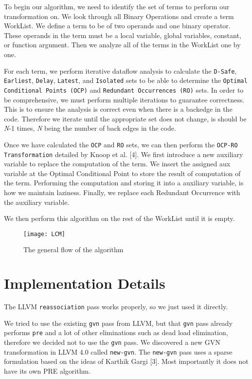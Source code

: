 \documentclass[onecolumn,10pt]{journal}
\begin{document}
  To begin our algorithm, we need to identify the set of terms to perform our transformation on. We look through all Binary Operations and create a term WorkList. We define a term to be of two operands and one binary operator. These operands in the term must be a local variable, global variables, constant, or function argument. Then we analyze all of the terms in the WorkList one by one. 

  For each term, we perform iterative dataflow analysis to calculate the \texttt{D-Safe}, \texttt{Earliest}, \texttt{Delay}, \texttt{Latest}, and \texttt{Isolated} sets to be able to determine the \texttt{Optimal Conditional Points (OCP)} and \texttt{Redundant Occurrences (RO)} sets. In order to be comprehensive, we must perform multiple iterations to guarantee correctness. This is to ensure the analysis is correct even when there is a backedge in the code. Therefore we iterate until the appropriate set does not change, is should be \textit{N}-1 times, \textit{N} being the number of back edges in the code. 

  Once we have calculated the \texttt{OCP} and \texttt{RO} sets, we can then perform the \texttt{OCP-RO Transformation} detailed by Knoop et al. [4]. We first introduce a new auxiliary variable to replace the computation of the term. We insert the assigned aux variable at the Optimal Conditional Point to store the result of computation of the term. Performing the computation and storing it into a auxiliary variable, is how we maintain laziness. Finally, we replace each Redundant Occurrence with the auxiliary variable.
    
    We then perform this algorithm on the rest of the WorkList until it is empty.
\begin{figure}[!b] 
\texttt{[image: LCM]}
\caption{The general flow of the algorithm}
\end{figure}

\pagebreak

\section{Implementation Details}
The LLVM \texttt{reassociation} pass works properly, so we just used it directly.  

We tried to use the existing \texttt{gvn} pass from LLVM, but that \texttt{gvn} pass already performs \texttt{pre} and a lot of other eliminations such as dead load elimination, therefore we decided not to use the \texttt{gvn} pass. We discovered a new GVN transformation in LLVM 4.0 called \texttt{new-gvn}. The \texttt{new-gvn} pass uses a sparse formulation based on the ideas of Karthik Gargi [3]. Most importantly it does not have its own PRE algorithm.
\end{document}
